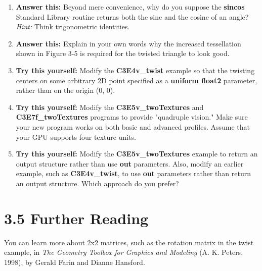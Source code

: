 \documentclass[../main.tex]{subfiles}
\begin{document}
\begin{enumerate}
\item \textbf{Answer this:} Beyond mere convenience, why do you suppose the \textbf{sincos} Standard Library routine returns both the sine and the cosine of an angle? \textit{Hint:} Think trigonometric identities.
\item \textbf{Answer this:} Explain in your own words why the increased tessellation shown in Figure 3-5 is required for the twisted triangle to look good.
\item \textbf{Try this yourself:} Modify the \textbf{C3E4v_twist} example so that the twisting centers on some arbitrary 2D point specified as a \textbf{uniform float2} parameter, rather than on the origin (0, 0).
\item \textbf{Try this yourself:} Modify the \textbf{C3E5v_twoTextures} and \textbf{C3E7f_twoTextures} programs to provide "quadruple vision." Make sure your new program works on both basic and advanced profiles. Assume that your GPU supports four texture units.
\item \textbf{Try this yourself:} Modify the \textbf{C3E5v_twoTextures} example to return an output structure rather than use \textbf{out} parameters. Also, modify an earlier example, such as \textbf{C3E4v_twist}, to use \textbf{out} parameters rather than return an output structure. Which approach do you prefer?
\end{enumerate}

\section{3.5 Further Reading}

You can learn more about 2x2 matrices, such as the rotation matrix in the twist example, in \textit{The Geometry Toolbox for Graphics and Modeling} (A. K. Peters, 1998), by Gerald Farin and Dianne Hansford.
\end{document}
